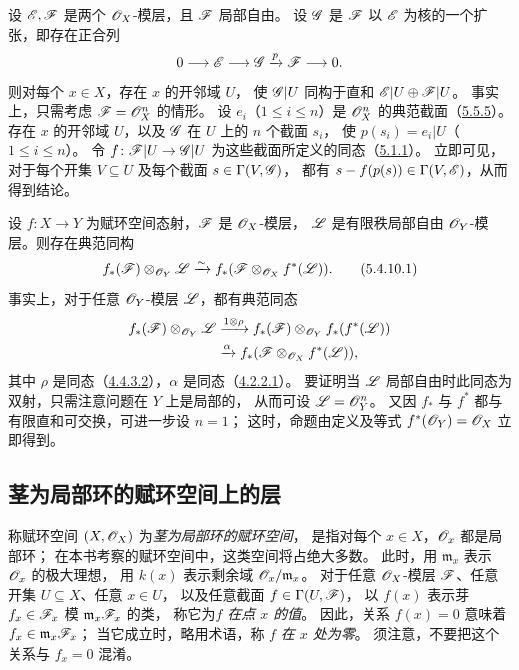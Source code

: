 设 $\mathscr E,\mathscr F$ 是两个 $\mathscr O_X$-模层，且 $\mathscr F$ 局部自由。
设 $\mathscr G$ 是 $\mathscr F$ 以 $\mathscr E$ 为核的一个扩张，即存在正合列
\[
 0\longrightarrow\mathscr E\longrightarrow\mathscr G\xrightarrow{p}\mathscr F\longrightarrow0.
\]
则对每个 $x\in X$，存在 $x$ 的开邻域 $U$，
使 $\mathscr G|U$ 同构于直和 $\mathscr E|U\oplus\mathscr F|U$。
事实上，只需考虑 $\mathscr F=\mathscr O_X^n$ 的情形。
设 $e_i$（$1\leq i\leq n$）是 $\mathscr O_X^n$ 的典范截面（\hyperlink{para:0:5.5.5}{5.5.5}）。
存在 $x$ 的开邻域 $U$，以及 $\mathscr G$ 在 $U$ 上的 $n$ 个截面 $s_i$，
使 $p(s_i)=e_i|U$（$1\leq i\leq n$）。
令 $f\colon\mathscr F|U\to\mathscr G|U$ 为这些截面所定义的同态（\hyperlink{para:0:5.1.1}{5.1.1}）。
立即可见，对于每个开集 $V\subseteq U$ 及每个截面 $s\in\Gamma(V,\mathscr G)$，
都有 $s-f(p(s))\in\Gamma(V,\mathscr E)$，从而得到结论。

设 $f\colon X\to Y$ 为赋环空间态射，$\mathscr F$ 是 $\mathscr O_X$-模层，
$\mathscr L$ 是有限秩局部自由 $\mathscr O_Y$-模层。则存在典范同构
\begin{equation}
 f_*(\mathscr F)\otimes_{\mathscr O_Y}\mathscr L
 \xrightarrow{\sim}f_*(\mathscr F\otimes_{\mathscr O_X}f^*(\mathscr L)).
 \tag{5.4.10.1}\label{eq:0:5.4.10.1}
\end{equation}
事实上，对于任意 $\mathscr O_Y$-模层 $\mathscr L$，都有典范同态
\[
 \begin{aligned}
 f_*(\mathscr F)\otimes_{\mathscr O_Y}\mathscr L
 &\xrightarrow{1\otimes\rho}
 f_*(\mathscr F)\otimes_{\mathscr O_Y}f_*(f^*(\mathscr L))\\
 &\xrightarrow{\alpha}f_*(\mathscr F\otimes_{\mathscr O_X}f^*(\mathscr L)),
 \end{aligned}
\]
其中 $\rho$ 是同态（\hyperref[eq:0:4.4.3.2]{4.4.3.2}），$\alpha$ 是同态（\hyperref[eq:0:4.2.2.1]{4.2.2.1}）。
要证明当 $\mathscr L$ 局部自由时此同态为双射，只需注意问题在 $Y$ 上是局部的，
从而可设 $\mathscr L=\mathscr O_Y^n$。
又因 $f_*$ 与 $f^*$ 都与有限直和可交换，可进一步设 $n=1$；
这时，命题由定义及等式 $f^*(\mathscr O_Y)=\mathscr O_X$ 立即得到。

\subsection{茎为局部环的赋环空间上的层}\hypertarget{heading:0:5.5}{}

称赋环空间 $(X,\mathscr O_X)$ 为\emph{茎为局部环的赋环空间}，
是指对每个 $x\in X$，$\mathscr O_x$ 都是局部环；
在本书考察的赋环空间中，这类空间将占绝大多数。
此时，用 $\mathfrak m_x$ 表示 $\mathscr O_x$ 的极大理想，
用 $k(x)$ 表示剩余域 $\mathscr O_x/\mathfrak m_x$。
对于任意 $\mathscr O_X$-模层 $\mathscr F$、任意开集 $U\subseteq X$、任意 $x\in U$，
以及任意截面 $f\in\Gamma(U,\mathscr F)$，
以 $f(x)$ 表示芽 $f_x\in\mathscr F_x$ 模 $\mathfrak m_x\mathscr F_x$ 的类，
称它为\emph{$f$ 在点 $x$ 的值}。
因此，关系 $f(x)=0$ 意味着 $f_x\in\mathfrak m_x\mathscr F_x$；
当它成立时，略用术语，称 $f$ \emph{在 $x$ 处为零}。
须注意，不要把这个关系与 $f_x=0$ 混淆。

